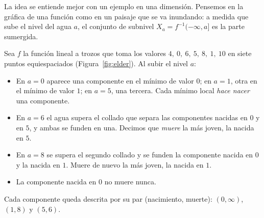 La idea se entiende mejor con un ejemplo en una dimensión. Pensemos en la
gráfica de una función como en un paisaje que se va inundando: a medida
que sube el nivel del agua $a$, el conjunto de subnivel
$X_a=f^{-1}(-\infty,a]$ es la parte sumergida.

\begin{ejemplo}
Sea $f$ la función lineal a trozos que toma los valores
$4,\ 0,\ 6,\ 5,\ 8,\ 1,\ 10$ en siete puntos equiespaciados
(Figura~\ref{fig:elder}). Al subir el nivel $a$:
\begin{itemize}
  \item En $a=0$ aparece una componente en el mínimo de valor $0$; en
  $a=1$, otra en el mínimo de valor $1$; en $a=5$, una tercera. Cada
  mínimo local \emph{hace nacer} una componente.
  \item En $a=6$ el agua supera el collado que separa las componentes
  nacidas en $0$ y en $5$, y ambas se funden en una. Decimos que
  \emph{muere} la más joven, la nacida en $5$.
  \item En $a=8$ se supera el segundo collado y se funden la componente
  nacida en $0$ y la nacida en $1$. Muere de nuevo la más joven, la
  nacida en $1$.
  \item La componente nacida en $0$ no muere nunca.
\end{itemize}
Cada componente queda descrita por su par (nacimiento, muerte):
$(0,\infty)$, $(1,8)$ y $(5,6)$.
\end{ejemplo}


